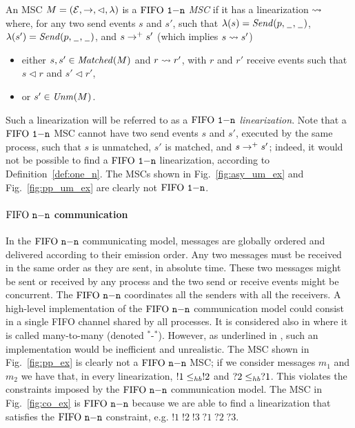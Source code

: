 \begin{definition}\label{def:one_n}
An MSC $M = (\mathcal{E},\to,\lhd,\lambda)$ is a \emph{$\text{FIFO } \mathtt{1\mathsf{-}n}$ MSC} if it has a linearization $\rightsquigarrow$ where, for any two send events $s$ and $s'$, such that $\lambda(s)={\mathit{Send}(p,\hspace{0.1em}\underline{\hspace{0.5em}}\hspace{0.1em},\hspace{0.1em}\underline{\hspace{0.5em}}\hspace{0.1em})}$, $\lambda(s')={\mathit{Send}(p,\hspace{0.1em}\underline{\hspace{0.5em}}\hspace{0.1em},\hspace{0.1em}\underline{\hspace{0.5em}}\hspace{0.1em})}$, and $s \to^+ s'$ (which implies $s \rightsquigarrow s'$)
\begin{itemize}%
	\item either $s,s' \in \mathit{Matched}(M)$ and $r \rightsquigarrow r'$, with  $r$ and $r'$   receive events such that $s \lhd r$ and $s' \lhd r'$,
	\item or $s' \in \mathit{Unm}(M)$.
\end{itemize}
\end{definition}

Such a linearization will be referred to as a \emph{$\text{FIFO } \mathtt{1\mathsf{-}n}$ linearization}. Note that a $\text{FIFO } \mathtt{1\mathsf{-}n}$ MSC cannot have two send events $s$ and $s'$, executed by the same process, such that $s$ is unmatched, $s'$ is matched, and $s \to^+ s'$; indeed, it would not be possible to find a $\text{FIFO } \mathtt{1\mathsf{-}n}$ linearization, according to Definition~\ref{def:one_n}. The MSCs shown in Fig.~\ref{fig:asy_um_ex} and Fig.~\ref{fig:pp_um_ex} are clearly not $\text{FIFO } \mathtt{1\mathsf{-}n}$.


\paragraph{\bf  $\text{FIFO } \mathtt{n\mathsf{-}n}$ communication}
In the $\text{FIFO } \mathtt{n\mathsf{-}n}$ communicating model, messages are globally ordered and delivered according to  their emission order. Any two messages must be received in the same order as they are sent, in absolute time. These two messages might be sent or received by any process and the two send or receive events might be concurrent.
The $\text{FIFO } \mathtt{n\mathsf{-}n}$ coordinates all the senders with all the receivers. A high-level implementation of the $\text{FIFO } \mathtt{n\mathsf{-}n}$ communication model could consist in a single FIFO channel shared by all processes. It is considered also in \cite{DBLP:journals/tcs/BasuB16} where it is called  many-to-many (denoted $^\ast$-$^\ast$). However, as underlined in \cite{DBLP:journals/fac/ChevrouHQ16}, such an implementation would be inefficient and unrealistic.
The MSC shown in Fig.~\ref{fig:pp_ex} is clearly not a $\text{FIFO } \mathtt{n\mathsf{-}n}$ MSC; if we consider messages $m_1$ and $m_2$ we have that, in every linearization, $!1 \leq_{hb} !2$ and $?2 \leq_{hb} ?1$. This violates the constraints imposed by the $\text{FIFO } \mathtt{n\mathsf{-}n}$ communication model. The MSC in Fig.~\ref{fig:co_ex} is $\text{FIFO } \mathtt{n\mathsf{-}n}$ because we are able to find a linearization that satisfies the $\text{FIFO } \mathtt{n\mathsf{-}n}$ constraint, e.g. $!1\;!2\;!3\;?1\;?2\;?3$.

